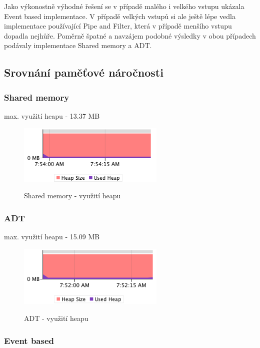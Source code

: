 \documentclass[11pt]{article}
\begin{document}
Jako výkonostně výhodné řešení se v případě malého i velkého vstupu ukázala Event based implementace. V případě velkých vstupů si ale ještě lépe vedla implementace používající Pipe and Filter, která v případě menšího vstupu dopadla nejhůře. Poměrně špatné a navzájem podobné výsledky v obou případech podávaly implementace Shared memory a ADT.

\subsection{Srovnání paměťové náročnosti}

\subsubsection{Shared memory}

max. využití heapu - 13.37 MB

\begin{figure}[htbp]
	\caption{Shared memory - využití heapu}
		\includegraphics[width=7cm]{shared-memory}
	\label{fig:shared-memory}
\end{figure}

\subsubsection{ADT}

max. využití heapu - 15.09 MB

\begin{figure}[htbp]
	\caption{ADT - využití heapu}
		\includegraphics[width=7cm]{adt-memory}
	\label{fig:adt-memory}
\end{figure}

\subsubsection{Event based}
\end{document}
